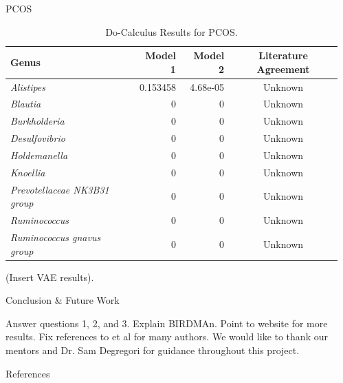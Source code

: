 \documentclass[final]{beamer}
\newlength{\sepwidth}
\newlength{\colwidth}
\newcommand{\separatorcolumn}{\begin{column}{\sepwidth}\end{column}}
\begin{document}
\begin{frame}[t]
\begin{columns}[t]
\begin{column}{\colwidth}
\begin{block}{PCOS}
    \begin{table}
      \centering
      \begin{tabular}{l r r c}
        \toprule
        \textbf{Genus} & \textbf{Model 1} & \textbf{Model 2} & \textbf{Literature Agreement} \\
        \midrule
        \textit{Alistipes} & 0.153458 & 4.68e-05 & Unknown \\
        \textit{Blautia} & 0 & 0 & Unknown \\
        \textit{Burkholderia} & 0 & 0 & Unknown \\
        \textit{Desulfovibrio} & 0 & 0 & Unknown \\
        \textit{Holdemanella} & 0 & 0 & Unknown \\
        \textit{Knoellia} & 0 & 0 & Unknown \\
        \textit{Prevotellaceae NK3B31 group} & 0 & 0 & Unknown \\
        \textit{Ruminococcus} & 0 & 0 & Unknown \\
        \textit{Ruminococcus gnavus group} & 0 & 0 & Unknown \\
        \bottomrule
      \end{tabular}
      \caption{Do-Calculus Results for PCOS.}
    \end{table}

   (Insert VAE results).

  \end{block}

  \begin{block}{Conclusion \& Future Work}

    Answer questions 1, 2, and 3. Explain BIRDMAn. Point to website for more results. Fix references to et al for many authors. We would like to thank our mentors and Dr. Sam Degregori for guidance throughout this project. 
    
  \end{block}

  \begin{block}{References}

    \footnotesize{}

  \end{block}

\end{column}

\separatorcolumn
\end{columns}
\end{frame}
\end{document}
